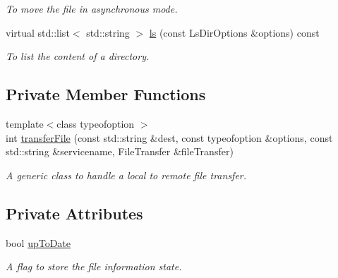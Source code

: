 \begin{DoxyCompactItemize}
\begin{DoxyCompactList}\small\item\em To move the file in asynchronous mode. \item\end{DoxyCompactList}\item 
virtual std::list$<$ std::string $>$ \hyperlink{classLocalFileProxy_ad4ec882a2a4bb3493d264ff202b42420}{ls} (const LsDirOptions \&options) const 
\begin{DoxyCompactList}\small\item\em To list the content of a directory. \item\end{DoxyCompactList}\end{DoxyCompactItemize}
\subsection*{Private Member Functions}
\begin{DoxyCompactItemize}
\item 
{\footnotesize template$<$class typeofoption $>$ }\\int \hyperlink{classLocalFileProxy_abbb7512da9f5692274d04bae413bc114}{transferFile} (const std::string \&dest, const typeofoption \&options, const std::string \&servicename, FileTransfer \&fileTransfer)
\begin{DoxyCompactList}\small\item\em A generic class to handle a local to remote file transfer. \item\end{DoxyCompactList}\end{DoxyCompactItemize}
\subsection*{Private Attributes}
\begin{DoxyCompactItemize}
\item 
\hypertarget{classLocalFileProxy_af82c963e0251fb01ab3fe02f3ac9a50f}{
bool \hyperlink{classLocalFileProxy_af82c963e0251fb01ab3fe02f3ac9a50f}{upToDate}}
\label{classLocalFileProxy_af82c963e0251fb01ab3fe02f3ac9a50f}

\begin{DoxyCompactList}\small\item\em A flag to store the file information state. \item\end{DoxyCompactList}\end{DoxyCompactItemize}


